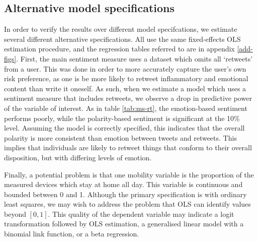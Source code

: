 \documentclass{article}
\begin{document}
\subsection{Alternative model specifications}\label{alt-specs}
In order to verify the results over different model specifcations, we estimate several different alternative specifications. All use the same fixed-effects OLS estimation procedure, and the regression tables referred to are in appendix \ref{add-figs}. First, the main sentiment measure uses a dataset which omits all `retweets' from a user. This was done in order to more accurately capture the user's own risk preference, as one is be more likely to retweet inflammatory and emotional content than write it oneself. As such, when we estimate a model which uses a sentiment measure that includes retweets, we observe a drop in predictive power of the variable of interest. As in table \ref{tab:ms-rt}, the emotion-based sentiment performs poorly, while the polarity-based sentiment is significant at the 10\% level. Assuming the model is correctly specified, this indicates that the overall polarity is more consistent than emotion between tweets and retweets. This implies that individuals are likely to retweet things that conform to their overall disposition, but with differing levels of emotion. 



Finally, a potential problem is that one mobility variable is the proportion of the measured devices which stay at home all day. This variable is continuous and bounded between 0 and 1. Although the primary specification is with ordinary least squares, we may wish to address the problem that OLS can identify values beyond \([0,1]\). This quality of the dependent variable may indicate a logit transformation followed by OLS estimation, a generalised linear model with a binomial link function, or a beta regression. 
\end{document}

